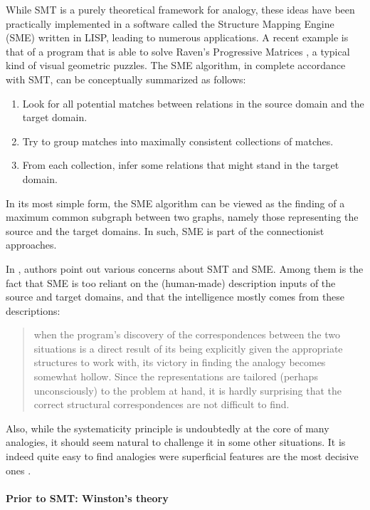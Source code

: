 While SMT is a purely theoretical framework for analogy, these ideas have been
practically implemented in a software called the Structure Mapping Engine (SME)
\cite{FalForKenGen89} written in LISP, leading to numerous applications. A
recent example is that of a program that is able to solve Raven's Progressive
Matrices \cite{LovForUsh10}, a typical kind of visual geometric
puzzles. The SME algorithm, in complete accordance with SMT, can be
conceptually summarized as follows:
\begin{enumerate}
    \item Look for all potential matches between relations in the source domain
      and the target domain.
    \item Try to group matches into maximally consistent collections of
      matches.
    \item From each collection, infer some relations that might stand in the
      target domain.
\end{enumerate}
In its most simple form, the SME algorithm can be viewed as the finding of a
maximum common subgraph between two graphs, namely those representing the
source and the target domains. In such, SME is part of the connectionist
approaches.

In  \cite{ChaFreHof92}, authors point out various concerns about SMT and SME.
Among them is the fact that SME is too reliant on the (human-made) description
inputs of the source and target domains, and that the intelligence mostly comes
from these descriptions:

\begin{quote}
  when the program’s discovery of the correspondences between the two situations
  is a direct result of its being explicitly given the appropriate structures
  to work with, its victory in finding the analogy becomes somewhat hollow.
  Since the representations are tailored (perhaps unconsciously) to the problem
  at hand, it is hardly surprising that the correct structural correspondences
  are not difficult to find.
\end{quote}

Also, while the systematicity principle is undoubtedly at the core of many
analogies, it should seem natural to challenge it in some other situations. It
is indeed quite easy to find analogies were superficial features are the most
decisive ones \cite{Bar10}.

\paragraph{Prior to SMT: Winston's theory\\}

